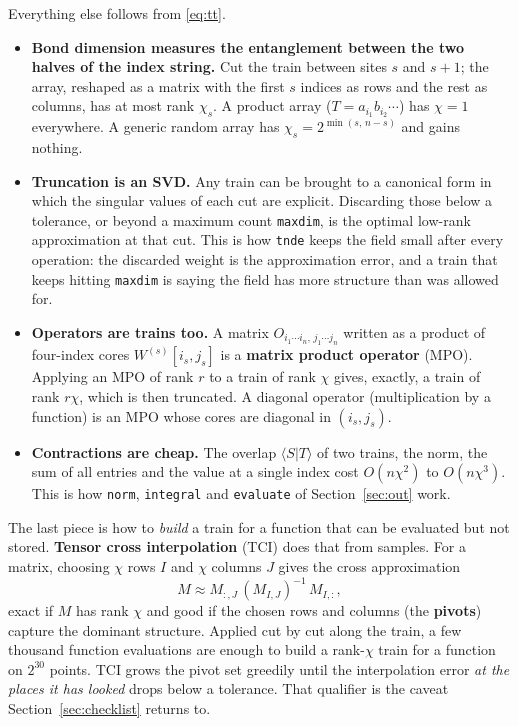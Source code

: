 \documentclass[11pt,a4paper]{article}
\newcommand{\code}[1]{\texttt{#1}}
\begin{document}
Everything else follows from \eqref{eq:tt}.
\begin{itemize}[leftmargin=1.5em]
\item \textbf{Bond dimension measures the entanglement between the two halves of the
  index string.} Cut the train between sites $s$ and $s+1$; the array, reshaped as a
  matrix with the first $s$ indices as rows and the rest as columns, has at most rank
  $\chi_s$. A product array ($T=a_{i_1}b_{i_2}\cdots$) has $\chi=1$ everywhere. A
  generic random array has $\chi_s=2^{\min(s,\,n-s)}$ and gains nothing.
\item \textbf{Truncation is an SVD.} Any train can be brought to a canonical form in
  which the singular values of each cut are explicit. Discarding those below a
  tolerance, or beyond a maximum count \code{maxdim}, is the optimal low-rank
  approximation at that cut. This is how \code{tnde} keeps the field small after every
  operation: the discarded weight is the approximation error, and a train that keeps
  hitting \code{maxdim} is saying the field has more structure than was allowed for.
\item \textbf{Operators are trains too.} A matrix $O_{i_1\cdots i_n,\,j_1\cdots j_n}$
  written as a product of four-index cores $W^{(s)}[i_s,j_s]$ is a \textbf{matrix
  product operator} (MPO). Applying an MPO of rank $r$ to a train of rank $\chi$ gives,
  exactly, a train of rank $r\chi$, which is then truncated. A diagonal operator
  (multiplication by a function) is an MPO whose cores are diagonal in $(i_s,j_s)$.
\item \textbf{Contractions are cheap.} The overlap $\langle S|T\rangle$ of two trains,
  the norm, the sum of all entries and the value at a single index cost $O(n\chi^2)$ to
  $O(n\chi^3)$. This is how \code{norm}, \code{integral} and \code{evaluate} of
  Section~\ref{sec:out} work.
\end{itemize}

The last piece is how to \emph{build} a train for a function that can be evaluated but
not stored. \textbf{Tensor cross interpolation} (TCI) does that from samples. For a
matrix, choosing $\chi$ rows $I$ and $\chi$ columns $J$ gives the cross approximation
\begin{equation}
M \approx M_{:,J}\,(M_{I,J})^{-1}\,M_{I,:},
\end{equation}
exact if $M$ has rank $\chi$ and good if the chosen rows and columns (the
\textbf{pivots}) capture the dominant structure. Applied cut by cut along the train, a
few thousand function evaluations are enough to build a rank-$\chi$ train for a
function on $2^{30}$ points. TCI grows the pivot set greedily until the interpolation
error \emph{at the places it has looked} drops below a tolerance. That qualifier is the
caveat Section~\ref{sec:checklist} returns to.
\end{document}
